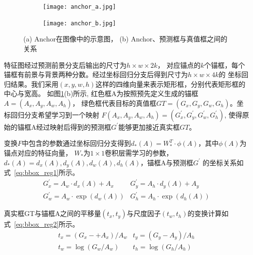 \begin{figure}[htbp]
	\centering
	\begin{subfigure}{0.45\linewidth}
		\centering
		\texttt{[image: anchor\_a.jpg]}
    \caption{}
	\end{subfigure}
	\centering
	\begin{subfigure}{0.45\linewidth}
		\centering
		\texttt{[image: anchor\_b.jpg]}
    \caption{}
	\end{subfigure}
	\caption{(a) Anchor在图像中的示意图， (b) Anchor、预测框与真值框之间的关系}
	\label{fig:anchor}
\end{figure}

特征图经过预测前景分支后输出的尺寸为$h\times w \times 2k$，
对应锚点的$k$个锚框，每个锚框有前景与背景两种分数。经过坐标回归分支后得到尺寸为$h\times w \times 4k$的
坐标回归结果。我们采用$(x, y, w, h)$这样的四维向量来表示矩形框，分别代表矩形框的中心与宽高。
如图\ref{fig:anchor}(b)所示, 红色框A为按照预先定义生成的锚框$A = \left( {{A_x},{A_y},{A_w},{A_h}} \right)$，
绿色框代表目标的真值框$GT = \left( {{G_x},{G_y},{G_w},{G_h}} \right)$。坐标回归分支希望学习到一个映射
$F\left(A_{x}, A_{y}, A_{w}, A_{h}\right)=\left(G_{x}^{\prime}, G_{y}^{\prime}, G_{w}^{\prime}, G_{h}^{\prime}\right)$,
使得原始的锚框A经过映射后得到的预测框$G^{\prime}$能够更加接近真实框$GT$。

变换$F$中包含的参数通过坐标回归分支得到$d_{*}(A)=W_{*}^{T} \cdot \phi(A)$，其中$\phi(A)$为锚点对应的特征向量，
$W_{*}$为$1\times1$卷积层需学习的参数，$d_{*}(A)=d_{x}(A), d_{y}(A), d_{w}(A), d_{h}(A)$，锚框A与预测框$G^{\prime}$
的坐标关系如式~\ref{eq:bbox_reg1}所示。
\begin{equation}
  \begin{array}{cc}
    G_{x}^{\prime} =A_{w} \cdot d_{x}(A)+A_{x} & G_{y}^{\prime} = A_{h} \cdot d_{y}(A)+A_{y} \\
    G_{w}^{\prime} =A_{w} \cdot \exp \left(d_{w}(A)\right) & G_{h}^{\prime} =A_{h} \cdot \exp \left(d_{h}(A)\right)
  \end{array}
  \label{eq:bbox_reg1}
\end{equation}

真实框GT与锚框A之间的平移量$(t_{x}, t_{y})$与尺度因子$(t_{w}, t_{h})$的变换计算如式~\ref{eq:bbox_reg2}所示。
\begin{equation}
  \begin{array}{cc}
    t_{x}=\left(G_{x}-+A_{x}\right) / A_{w} & t_{y}=\left(G_{y}-A_{y}\right) / A_{h} \\
    t_{w}=\log \left(G_{w} / A_{w}\right) & t_{h}=\log \left(G_{h} / A_{h}\right)
  \end{array}
  \label{eq:bbox_reg2}
\end{equation}

